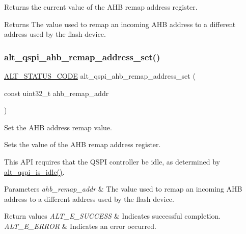 Returns the current value of the A\+HB remap address register.

\begin{DoxyReturn}{Returns}
The value used to remap an incoming A\+HB address to a different address used by the flash device. 
\end{DoxyReturn}
\mbox{\label{group__ALT__QSPI__DAC_gad7b0dc3a61560e7d7c2edeb9204698ad}} 
\subsubsection{\texorpdfstring{alt\_qspi\_ahb\_remap\_address\_set()}{alt\_qspi\_ahb\_remap\_address\_set()}}
{\footnotesize\ttfamily \mbox{\hyperlink{hwlib_8h_abdb0d369f069723ca55d6c94bcaaaa12}{A\+L\+T\+\_\+\+S\+T\+A\+T\+U\+S\+\_\+\+C\+O\+DE}} alt\+\_\+qspi\+\_\+ahb\+\_\+remap\+\_\+address\+\_\+set (\begin{DoxyParamCaption}\item[{const uint32\+\_\+t}]{ahb\+\_\+remap\+\_\+addr }\end{DoxyParamCaption})}

Set the A\+HB address remap value.

Sets the value of the A\+HB remap address register.

This A\+PI requires that the Q\+S\+PI controller be idle, as determined by \mbox{\hyperlink{group__ALT__QSPI__CSR_gaeaa7e762d8b79b1989385c978174b7b8}{alt\+\_\+qspi\+\_\+is\+\_\+idle()}}.


\begin{DoxyParams}{Parameters}
{\em ahb\+\_\+remap\+\_\+addr} & The value used to remap an incoming A\+HB address to a different address used by the flash device.\\
\hline
\end{DoxyParams}

\begin{DoxyRetVals}{Return values}
{\em A\+L\+T\+\_\+\+E\+\_\+\+S\+U\+C\+C\+E\+SS} & Indicates successful completion. \\
\hline
{\em A\+L\+T\+\_\+\+E\+\_\+\+E\+R\+R\+OR} & Indicates an error occurred. \\
\hline
\end{DoxyRetVals}
\mbox{\label{group__ALT__QSPI__DAC_ga87c0f59732f55d34b21cb53a26e385c2}} 
